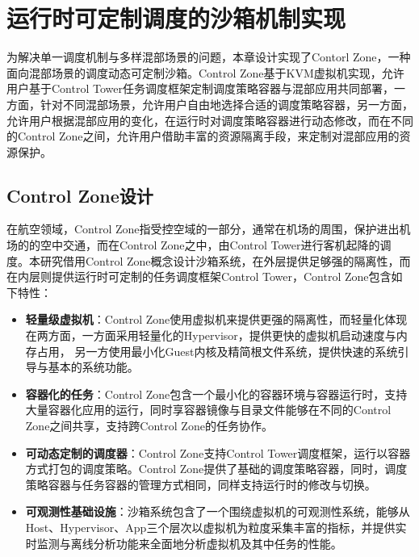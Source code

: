\chapter{运行时可定制调度的沙箱机制实现}\label{chap:control_zone}

为解决单一调度机制与多样混部场景的问题，本章设计实现了Contorl Zone，一种面向混部场景的调度动态可定制沙箱。Control Zone基于KVM虚拟机实现，允许用户基于Control Tower任务调度框架定制调度策略容器与混部应用共同部署，一方面，针对不同混部场景，允许用户自由地选择合适的调度策略容器，另一方面，允许用户根据混部应用的变化，在运行时对调度策略容器进行动态修改，而在不同的Control Zone之间，允许用户借助丰富的资源隔离手段，来定制对混部应用的资源保护。

\section{Control Zone设计}



在航空领域，Control Zone指受控空域的一部分，通常在机场的周围，保护进出机场的的空中交通，而在Control Zone之中，由Control Tower进行客机起降的调度。本研究借用Control Zone概念设计沙箱系统，在外层提供足够强的隔离性，而在内层则提供运行时可定制的任务调度框架Control Tower，Control Zone包含如下特性：

\begin{itemize}
    \item \textbf{轻量级虚拟机}：Control Zone使用虚拟机来提供更强的隔离性，而轻量化体现在两方面，一方面采用轻量化的Hypervisor，提供更快的虚拟机启动速度与内存占用， 另一方使用最小化Guest内核及精简根文件系统，提供快速的系统引导与基本的系统功能。
    \item \textbf{容器化的任务}：Control Zone包含一个最小化的容器环境与容器运行时，支持大量容器化应用的运行，同时享容器镜像与目录文件能够在不同的Control Zone之间共享，支持跨Control Zone的任务协作。
    \item \textbf{可动态定制的调度器}：Control Zone支持Control Tower调度框架，运行以容器方式打包的调度策略。Control Zone提供了基础的调度策略容器，同时，调度策略容器与任务容器的管理方式相同，同样支持运行时的修改与切换。
    \item \textbf{可观测性基础设施}：沙箱系统包含了一个围绕虚拟机的可观测性系统，能够从Host、Hypervisor、App三个层次以虚拟机为粒度采集丰富的指标，并提供实时监测与离线分析功能来全面地分析虚拟机及其中任务的性能。
\end{itemize}

